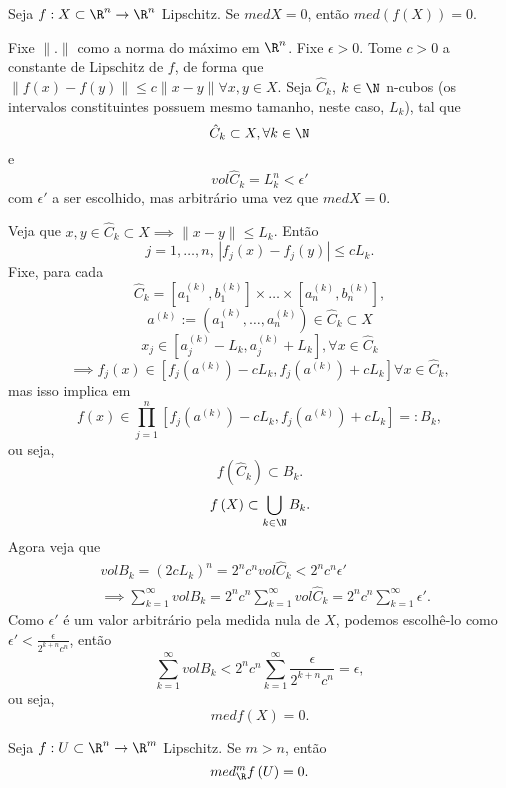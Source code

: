 \begin{prop}
    Seja $f : X\subset \R^{n}\to \R^{n}$ Lipschitz. Se $med X = 0$, então $med\left(  f\left( X \right)\right)   = 0$.
\end{prop}
\begin{demo}
    Fixe $\|.\|$ como a norma do máximo em $\R^{n}$. Fixe $\epsilon>0$. Tome $c>0$ a constante de Lipschitz de $f$, de forma que $\|f\left( x \right) -f\left( y \right) \| \le  c \|x-y\| \forall x, y \in X$. Seja $\hat{C}_k$, $k\in \N$ n-cubos (os intervalos constituintes possuem mesmo tamanho, neste caso, $L_k$), tal que \[
    \hat{C}_k \subset X, \forall k\in \N
    \] e \[
    vol \hat{C}_k = L_k^{n} < \epsilon'
    \] com $\epsilon'$ a ser escolhido, mas arbitrário uma vez que $med X = 0$.

    Veja que $x, y \in \hat{C}_k\subset X \implies \|x-y\|\le L_k$. Então \[
    j=1,\ldots,n\text{, } \left| f_j\left( x \right) - f_j\left( y \right)  \right| \le cL_k
    .\] Fixe, para cada \[
    \hat{C}_k = \left[ a_1^{(k)}, b_1^{(k)} \right] \times \ldots\times \left[ a_n^{(k)}, b_n^{(k)} \right]
    ,\] \[
    a^{(k)} := \left( a_1^{(k)}, \ldots, a_n^{(k)} \right) \in \hat{C}_k\subset X
    \] \[
    x_j\in \left[ a_j^{(k)}-L_k, a_j^{(k)}+L_k \right] , \forall x\in \hat{C}_k
    \]  \[
    \implies f_j\left( x \right) \in \left[ f_j\left( a^{(k)} \right) -cL_k, f_j\left( a^{(k)} \right) +cL_k \right] \forall x \in \hat{C}_k
    ,\] mas isso implica em \[
    f\left( x \right) \in \prod_{j=1}^{n}  \left[ f_j\left( a^{(k)} \right) -cL_k, f_j\left( a^{(k)} \right) +cL_k \right] =: B_k
    ,\] ou seja, \[
    f\left( \hat{C}_k \right) \subset B_k
    .\] \[
    f\left( X \right) \subset \bigcup_{k\in \N} B_k
    .\] Agora veja que 
    \begin{align*}
    & vol B_k = \left( 2cL_k \right) ^{n} = 2^{n}c^{n} vol \hat{C}_k < 2^{n}c^{n}\epsilon' \\ 
    & \implies \sum_{k=1}^{\infty} vol B_k = 2^{n}c^{n}\sum_{k=1}^{\infty} vol \hat{C}_k = 2^{n}c^{n}\sum_{k=1}^{\infty} \epsilon'
    .\end{align*}
    Como $\epsilon'$ é um valor arbitrário pela medida nula de $X$, podemos escolhê-lo como $\epsilon' < \frac{\epsilon}{2^{k+n}c^{n}}$, então \[
    \sum_{k=1}^{\infty} vol B_k < 2^{n}c^{n}\sum_{k=1}^{\infty}\frac{\epsilon}{2^{k+n}c^{n}} = \epsilon
    ,\] ou seja, \[
    med f\left( X \right) = 0
.\] 
\end{demo}

\begin{corollary}
    Seja $f: U\subset \R^{n}\to \R^{m}$ Lipschitz. Se $m>n$, então \[
    med_\R^{m} f\left( U \right) = 0
    .\] 
\end{corollary}

